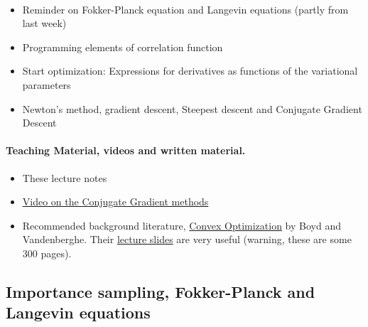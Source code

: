\documentclass[%
oneside,                 %
final,                   %
10pt]{article}
\begin{document}
\paragraph{}
\begin{itemize}
\item Reminder on Fokker-Planck equation and Langevin equations (partly from last week)

\item Programming elements of correlation function

\item Start optimization: Expressions for derivatives as functions of the variational parameters

\item Newton's method, gradient descent, Steepest descent and Conjugate Gradient Descent 
\end{itemize}

\noindent




\paragraph{Teaching Material, videos and written material.}
\begin{itemize}
\item These lecture notes

\item \href{{https://www.youtube.com/watch?v=eAYohMUpPMA&ab_channel=TomCarlone}}{Video on the Conjugate Gradient methods}

\item Recommended background literature, \href{{https://web.stanford.edu/~boyd/cvxbook/}}{Convex Optimization} by Boyd and Vandenberghe. Their \href{{https://web.stanford.edu/~boyd/cvxbook/bv_cvxslides.pdf}}{lecture slides} are very useful (warning, these are some 300 pages).
\end{itemize}

\noindent



\subsection{Importance sampling, Fokker-Planck and Langevin equations}
\end{document}
